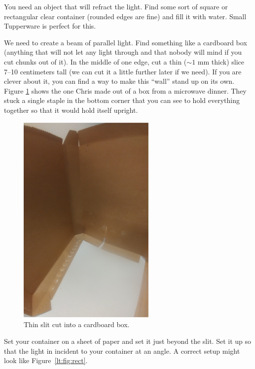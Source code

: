 \begin{steps}

	\item You need an object that will refract the light. Find some sort of square or rectangular clear container (rounded edges are fine) and fill it with water. Small Tupperware is perfect for this.
	
	\item We need to create a beam of parallel light. Find something like a cardboard box (anything that will not let any light through and that nobody will mind if you cut chunks out of it). In the middle of one edge, cut a thin ($\sim{}1$ mm thick) slice 7--10 centimeters tall (we can cut it a little further later if we need). If you are clever about it, you can find a way to make this “wall” stand up on its own. Figure \ref{lt:fig:slit} shows the one Chris made out of a box from a microwave dinner. They stuck a single staple in the bottom corner that you can see to hold everything together so that it would hold itself upright.

\begin{figure}
	\centering
	\includegraphics[width=0.6\textwidth]{lens-telescope/cardboard-slit.png}
	\caption{Thin slit cut into a cardboard box.}\label{lt:fig:slit}
\end{figure}

	\item Set your container on a sheet of paper and set it just beyond the slit. Set it up so that the light in incident to your container at an angle. A correct setup might look like Figure\ \ref{lt:fig:rect}.


\end{steps}
